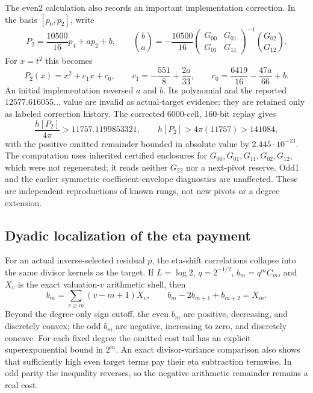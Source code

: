 \documentclass[11pt]{article}
\theoremstyle{definition}
\theoremstyle{remark}
\begin{document}
The even2 calculation also records an important implementation correction. In
the basis $[p_0,p_2]$, write
\begin{equation}
 P_2=\frac{10500}{16}p_4+a p_2+b,
 \qquad
 \binom{b}{a}=-\frac{10500}{16}
  \begin{pmatrix}G_{00}&G_{01}\\G_{01}&G_{11}\end{pmatrix}^{-1}
  \binom{G_{02}}{G_{12}}.
 \label{eq:even2-coordinate-order}
\end{equation}
For $x=t^2$ this becomes
\begin{equation}
 P_2(x)=x^2+c_1x+c_0,
 \qquad c_1=-\frac{551}{8}+\frac{2a}{33},
 \qquad c_0=\frac{6419}{16}-\frac{47a}{66}+b.
\end{equation}
An initial implementation reversed $a$ and $b$. Its polynomial and the reported
$12577.616055\ldots$ value are invalid as actual-target evidence; they are
retained only as labeled correction history. The corrected 6000-cell, 160-bit
replay gives
\begin{equation}
 \frac{h[P_2]}{4\pi}>11757.1199853321,
 \qquad h[P_2]>4\pi(11757)>141084,
 \label{eq:even2-corrected}
\end{equation}
with the positive omitted remainder bounded in absolute value by
$2.445\cdot10^{-13}$. The computation uses inherited certified enclosures for
$G_{00},G_{01},G_{11},G_{02},G_{12}$, which were not regenerated; it reads
neither $G_{22}$ nor a next-pivot reserve. Odd1 and the earlier symmetric
coefficient-envelope diagnostics are unaffected. These are independent
reproductions of known rungs, not new pivots or a degree extension.

\subsection{Dyadic localization of the eta payment}

For an actual inverse-selected residual $p$, the eta-shift correlations collapse
into the same divisor kernels as the target. If $L=\log2$, $q=2^{-1/2}$,
$b_m=q^mC_m$, and $X_v$ is the exact valuation-$v$ arithmetic shell, then
\begin{equation}
 b_m=\sum_{v\ge m}(v-m+1)X_v,
 \qquad b_m-2b_{m+1}+b_{m+2}=X_m.
 \label{eq:dyadic-recurrence}
\end{equation}
Beyond the degree-only sign cutoff, the even $b_m$ are positive, decreasing,
and discretely convex; the odd $b_m$ are negative, increasing to zero, and
discretely concave. For each fixed degree the omitted cost tail has an explicit
superexponential bound in $2^m$. An exact divisor-variance comparison also
shows that sufficiently high even target terms pay their eta subtraction
termwise. In odd parity the inequality reverses, so the negative arithmetic
remainder remains a real cost.
\end{document}
